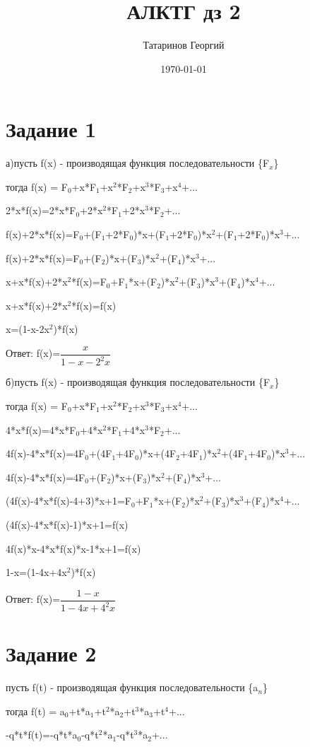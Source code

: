 \documentclass[a4paper, 12pt]{article}
\title{АЛКТГ дз 2}
\author{Татаринов Георгий}
\date{\today}
\newcommand{\ans}{Ответ: }
\begin{document}
	\maketitle
	\section*{Задание 1}
		а)пусть f(x) - производящая функция последовательности \{F$_x$\}

		тогда f(x) = F$_0$+x*F$_1$+x$^2$*F$_2$+x$^3$*F$_3$+x$^4$+...

		2*x*f(x)=2*x*F$_0$+2*x$^2$*F$_1$+2*x$^3$*F$_2$+...

		f(x)+2*x*f(x)=F$_0$+(F$_1$+2*F$_0$)*x+(F$_1$+2*F$_0$)*x$^2$+(F$_1$+2*F$_0$)*x$^3$+...

		f(x)+2*x*f(x)=F$_0$+(F$_2$)*x+(F$_3$)*x$^2$+(F$_4$)*x$^3$+...

		x+x*f(x)+2*x$^2$*f(x)=F$_0$+F$_1$*x+(F$_2$)*x$^2$+(F$_3$)*x$^3$+(F$_4$)*x$^4$+...

		x+x*f(x)+2*x$^2$*f(x)=f(x)

		x=(1-x-2x$^2$)*f(x)

		\ans f(x)=$\dfrac{x}{1-x-2^2x}$

		б)пусть f(x) - производящая функция последовательности \{F$_x$\}

		тогда f(x) = F$_0$+x*F$_1$+x$^2$*F$_2$+x$^3$*F$_3$+x$^4$+...

		4*x*f(x)=4*x*F$_0$+4*x$^2$*F$_1$+4*x$^3$*F$_2$+...

		4f(x)-4*x*f(x)=4F$_0$+(4F$_1$+4F$_0$)*x+(4F$_2$+4F$_1$)*x$^2$+(4F$_1$+4F$_0$)*x$^3$+...

		4f(x)-4*x*f(x)=4F$_0$+(F$_2$)*x+(F$_3$)*x$^2$+(F$_4$)*x$^3$+...

		(4f(x)-4*x*f(x)-4+3)*x+1=F$_0$+F$_1$*x+(F$_2$)*x$^2$+(F$_3$)*x$^3$+(F$_4$)*x$^4$+...

		(4f(x)-4*x*f(x)-1)*x+1=f(x)

		4f(x)*x-4*x*f(x)*x-1*x+1=f(x)

		1-x=(1-4x+4x$^2$)*f(x)

		\ans f(x)=$\dfrac{1-x}{1-4x+4^2x}$
	\section*{Задание 2}
		пусть f(t) - производящая функция последовательности \{a$_n$\}

		тогда f(t) = a$_0$+t*a$_1$+t$^2$*a$_2$+t$^3$*a$_3$+t$^4$+...

		-q*t*f(t)=-q*t*a$_0$-q*t$^2$*a$_1$-q*t$^3$*a$_2$+...
\end{document}
